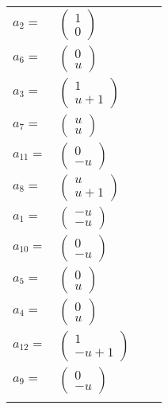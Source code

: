 \documentclass[1p]{elsarticle_modified}
\theoremstyle{definition}
\begin{document}
\begin{tabular}{m{7pt} m{180pt} m{7pt} m{180pt} }
\flushright $a_{2}=$&$\begin{pmatrix}1\\0\end{pmatrix}$ \\
\flushright $a_{6}=$&$\begin{pmatrix}0\\u\end{pmatrix}$ \\
\flushright $a_{3}=$&$\begin{pmatrix}1\\u+1\end{pmatrix}$ \\
\flushright $a_{7}=$&$\begin{pmatrix}u\\u\end{pmatrix}$ \\
\flushright $a_{11}=$&$\begin{pmatrix}0\\- u\end{pmatrix}$ \\
\flushright $a_{8}=$&$\begin{pmatrix}u\\u+1\end{pmatrix}$ \\
\flushright $a_{1}=$&$\begin{pmatrix}- u\\- u\end{pmatrix}$ \\
\flushright $a_{10}=$&$\begin{pmatrix}0\\- u\end{pmatrix}$ \\
\flushright $a_{5}=$&$\begin{pmatrix}0\\u\end{pmatrix}$ \\
\flushright $a_{4}=$&$\begin{pmatrix}0\\u\end{pmatrix}$ \\
\flushright $a_{12}=$&$\begin{pmatrix}1\\- u+1\end{pmatrix}$ \\
\flushright $a_{9}=$&$\begin{pmatrix}0\\- u\end{pmatrix}$\\&\end{tabular}
\end{document}
